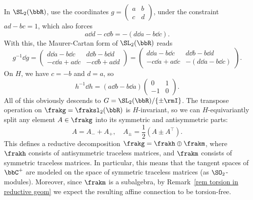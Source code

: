 \begin{example}
    In $\SL_2(\bbR)$, use the coordinates $g=\left(\begin{smallmatrix}
        a & b\\ c& d
    \end{smallmatrix}\right)$, under the constraint $ad-bc=1$, which also forces 
    \[a\dd d-c\dd b=-(d\dd a-b\dd c).\]
    With this, the Maurer-Cartan form of $\SL_2(\bbR)$ reads 
    \[g^{-1}\dd g=\begin{pmatrix}
        d\dd a -b\dd c & d\dd b-b\dd d\\
        -c\dd a+a\dd c & -c\dd b+a\dd d
    \end{pmatrix}=
    \begin{pmatrix}
        d\dd a-b\dd c & d\dd b-b\dd d\\
        -c\dd a+a\dd c & -(d\dd a-b\dd c)
    \end{pmatrix}.
    \]
    On $H$, we have $c=-b$ and $d=a$, so 
    \[h^{-1}\dd h=(a\dd b-b\dd a)\begin{pmatrix}
        0 & 1\\
        -1 & 0
    \end{pmatrix}.\]
    All of this obviously descends to $G=\SL_2(\bbR)\slash \{\pm \rmI\}$. The transpose operation on $\frakg=\fraksl_{2}(\bbR)$ is $H$-invariant, so we can $H$-equivariantly split any element $A\in\frakg$ into its symmetric and antisymmetric parts:
    \[A=A_-+A_+,\quad A_\pm=\frac12(A\pm A^\top ).\]
    This defines a reductive decomposition $\frakg=\frakh\oplus\frakm$, where $\frakh$ consists of antisymmetric traceless matrices, and $\frakm$ consists of symmetric traceless matrices. In particular, this means that the tangent spaces of $\bbC^+$ are modeled on the space of symmetric traceless matrices (as $\SO_2$-modules). Moreover, since $\frakm$ is a subalgebra, by Remark~\ref{rem torsion in reductive geom} we expect the resulting affine connection to be torsion-free.


\end{example}
